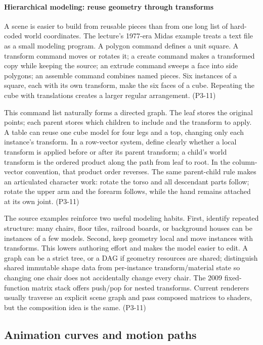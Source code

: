\paragraph{Hierarchical modeling: reuse geometry through transforms}\label{hierarchical-modeling-reuse-geometry-through-transforms}

A scene is easier to build from reusable pieces than from one long list of hard-coded world coordinates. The lecture's 1977-era Midas example treats a text file as a small modeling program. A polygon command defines a unit square. A transform command moves or rotates it; a create command makes a transformed copy while keeping the source; an extrude command sweeps a face into side polygons; an assemble command combines named pieces. Six instances of a square, each with its own transform, make the six faces of a cube. Repeating the cube with translations creates a larger regular arrangement. (P3-11)

This command list naturally forms a directed graph. The leaf stores the original points; each parent stores which children to include and the transform to apply. A table can reuse one cube model for four legs and a top, changing only each instance's transform. In a row-vector system, define clearly whether a local transform is applied before or after its parent transform; a child's world transform is the ordered product along the path from leaf to root. In the column-vector convention, that product order reverses. The same parent-child rule makes an articulated character work: rotate the torso and all descendant parts follow; rotate the upper arm and the forearm follows, while the hand remains attached at its own joint. (P3-11)

The source examples reinforce two useful modeling habits. First, identify repeated structure: many chairs, floor tiles, railroad boards, or background houses can be instances of a few models. Second, keep geometry local and move instances with transforms. This lowers authoring effort and makes the model easier to edit. A graph can be a strict tree, or a DAG if geometry resources are shared; distinguish shared immutable shape data from per-instance transform/material state so changing one chair does not accidentally change every chair. The 2009 fixed-function matrix stack offers push/pop for nested transforms. Current renderers usually traverse an explicit scene graph and pass composed matrices to shaders, but the composition idea is the same. (P3-11)

\subsection{Animation curves and motion paths}\label{animation-curves-and-motion-paths}

